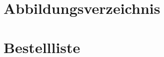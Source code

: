\documentclass[12pt,a4paper,bibliography=totoc,listof=totoc]{scrartcl}
\begin{document}
\section {Abbildungsverzeichnis}
\listoffigures
\pagebreak

\listoftables
\pagebreak


\renewcommand\refname{Literaturverzeichnis}
\lhead{}
%


\pagebreak

\section {Bestellliste}
\end{document}
